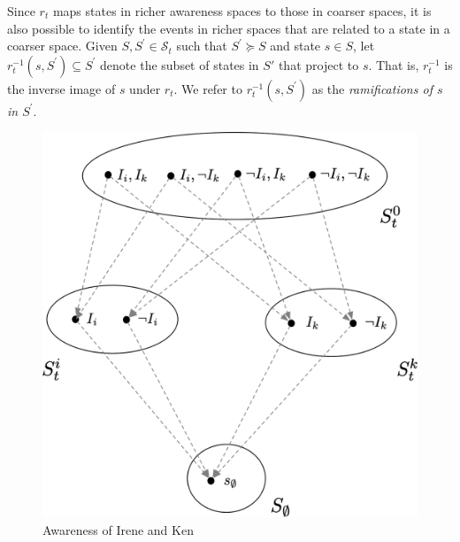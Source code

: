 \documentclass[
11pt,
titlepage,
reqno,
]{article}%
\theoremstyle{definition}
\begin{document}
Since $r_t$ maps states in richer awareness spaces to those in coarser spaces, it is also possible to identify the events in  richer spaces that are related to a state in a coarser space. Given $S, S^\prime \in \mathcal{S}_t$ such that $S^\prime \succeq S$ and state $s\in S$,  let $r^{-1}_t(s,S^\prime)\subseteq S^\prime$  denote the subset of states in $S'$ that project to $s$.
That is, $r^{-1}_t$ is the inverse image of $s$ under $r_t$. 
We refer to $r^{-1}_t(s,S^\prime)$  as the \emph{ramifications of $s$ in $S^\prime$}.

\begin{figure}[h!]	
	\begin{center}
		\includegraphics[scale=.7]{lattice.png}
	\end{center}
\caption{Awareness of Irene and Ken\label{lattice}}
\end{figure}
\end{document}
